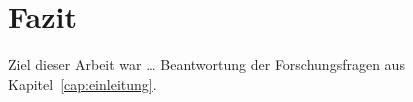 \section{Fazit}
\label{cap:fazit}

Ziel dieser Arbeit war \dots
Beantwortung der Forschungsfragen aus Kapitel~\ref{cap:einleitung}.
